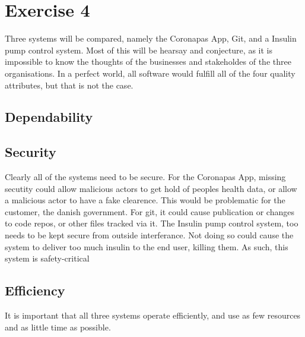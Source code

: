 \section{Exercise 4}
Three systems will be compared, namely the Coronapas App, Git, and a Insulin pump control system.
Most of this will be hearsay and conjecture, as it is impossible to know the thoughts of the businesses and stakeholdes of the three organisations. 
In a perfect world, all software would fulfill all of the four quality attributes, but that is not the case.

\subsection{Dependability}




\subsection{Security}
Clearly all of the systems need to be secure.
For the Coronapas App, missing secutity could allow malicious actors to get hold of peoples health data, or allow a malicious actor to have a fake clearence.
This would be problematic for the customer, the danish government.
For git, it could cause publication or changes to code repos, or other files tracked via it.
The Insulin pump control system, too needs to be kept secure from outside interferance.
Not doing so could cause the system to deliver too much insulin to the end user, killing them.
As such, this system is safety-critical



\subsection{Efficiency}
It is important that all three systems operate efficiently, and use as few resources and as little time as possible.

